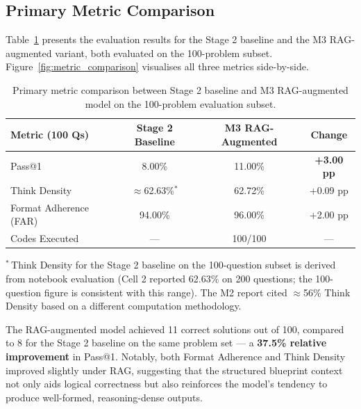 \documentclass[12pt,a4paper]{article}
\begin{document}
\subsection{Primary Metric Comparison}

Table~\ref{tab:primary} presents the evaluation results for the Stage 2 baseline and the M3 RAG-augmented variant, both evaluated on the 100-problem subset. Figure~\ref{fig:metric_comparison} visualises all three metrics side-by-side.

\begin{table}[H]
\centering
\caption{Primary metric comparison between Stage 2 baseline and M3 RAG-augmented model on the 100-problem evaluation subset.}
\label{tab:primary}
\renewcommand{\arraystretch}{1.35}
\begin{tabularx}{\textwidth}{Xccc}
\toprule
\textbf{Metric (100 Qs)}
  & \textbf{Stage 2 Baseline}
  & \textbf{M3 RAG-Augmented}
  & \textbf{Change} \\
\midrule
Pass@1                    & 8.00\%                  & 11.00\%   & \textbf{+3.00 pp}  \\
Think Density             & $\approx$62.63\%$^{*}$  & 62.72\%   & +0.09 pp           \\
Format Adherence (FAR)    & 94.00\%                 & 96.00\%   & +2.00 pp           \\
Codes Executed            & ---                     & 100/100   & ---                \\
\bottomrule
\end{tabularx}
\smallskip

\noindent\footnotesize{$^{*}$\,Think Density for the Stage 2 baseline on the 100-question subset is derived from notebook evaluation (Cell 2 reported 62.63\% on 200 questions; the 100-question figure is consistent with this range). The M2 report cited $\approx$56\% Think Density based on a different computation methodology.}
\end{table}

The RAG-augmented model achieved 11 correct solutions out of 100, compared to 8 for the Stage 2 baseline on the same problem set --- a \textbf{37.5\% relative improvement} in Pass@1. Notably, both Format Adherence and Think Density improved slightly under RAG, suggesting that the structured blueprint context not only aids logical correctness but also reinforces the model's tendency to produce well-formed, reasoning-dense outputs.
\end{document}
